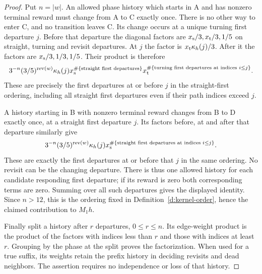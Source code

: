 \begin{proof}
Put \(n=|w|\). An allowed phase history which starts in A and
has nonzero terminal reward must change from A to C exactly once.
There is no other way to enter C, and no transition leaves C.
Its change occurs at a unique turning first departure \(j\).
Before that departure the diagonal factors are
\(x_{\rm s}/3,x_{\rm t}/3,1/5\) on straight, turning and revisit
departures. At \(j\) the factor is
\(x_{\rm t}\kappa_h(j)/3\). After it the factors are
\(x_{\rm s}/3,1/3,1/5\). Their product is therefore
\[
 3^{-n}(3/5)^{\operatorname{rev}(w)}\kappa_h(j)
 x_{\rm s}^{\#\{\text{straight first departures}\}}
 x_{\rm t}^{\#\{\text{turning first departures at indices }i\le j\}}.
\]
These are precisely the first departures at or before \(j\) in
the straight-first ordering, including all straight first departures
even if their path indices exceed \(j\).

A history starting in B with nonzero terminal reward changes from
B to D exactly once, at a straight first departure \(j\). Its
factors before, at and after that departure similarly give
\[
 3^{-n}(3/5)^{\operatorname{rev}(w)}\kappa_h(j)
 x_{\rm s}^{\#\{\text{straight first departures at indices }i\le j\}}.
\]
These are exactly the first departures at or before that \(j\) in
the same ordering. No revisit can be the changing departure.
There is thus one allowed history for each candidate responding
first departure; if its reward is zero both corresponding terms
are zero. Summing over all such departures gives the displayed
identity. Since \(n>12\), this is the ordering fixed in
Definition~\ref{d:kernel-order}, hence the claimed contribution
to \(M_1h\).

Finally split a history after \(r\) departures, \(0\le r\le n\).
Its edge-weight product is the product of the factors with indices
less than \(r\) and those with indices at least \(r\).
Grouping by the phase at the split proves the factorization.
When used for a true suffix, its weights retain the prefix history
in deciding revisits and dead neighbors. The assertion requires
no independence or loss of that history.
\end{proof}

